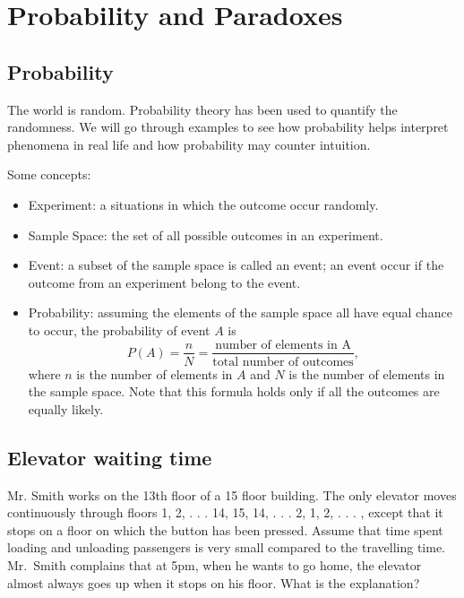 \hypertarget{ch:probability}{%
\chapter{Probability and Paradoxes}\label{ch:probability}}

\hypertarget{probability}{%
\section{Probability}\label{probability}}

The world is random. Probability theory has been used to quantify the
randomness. We will go through examples to see how probability helps
interpret phenomena in real life and how probability may counter
intuition.

Some concepts:
\begin{itemize}
\item Experiment: a situations in which the outcome occur randomly.
\item Sample Space: the set of all possible outcomes in an experiment.
\item Event: a subset of the sample space is called an event; an event
  occur if the outcome from an experiment belong to the event.
\item Probability: assuming the elements of the sample space all have
  equal chance to occur, the probability of event $A$ is\\
  \begin{equation*}
    P(A)=\frac{n}{N}
    =\frac{\text{number of elements in A}}{\text{total number of outcomes}},
  \end{equation*}
  where \(n\) is the number of elements in \(A\) and \(N\) is the
  number of elements in the sample space.  Note that this formula
  holds only if all the outcomes are equally likely.
\end{itemize}

\hypertarget{example-elevator-waiting-time}{%
  \section{Elevator waiting
    time}\label{example-elevator-waiting-time}}

Mr. Smith works on the 13th floor of a 15 floor building. The only
elevator moves continuously through floors 1, 2, . . . 14, 15, 14,
. . . 2, 1, 2, . . . , except that it stops on a floor on which the
button has been pressed. Assume that time spent loading and unloading
passengers is very small compared to the travelling time.  Mr.~Smith
complains that at 5pm, when he wants to go home, the elevator almost
always goes up when it stops on his floor. What is the explanation?

